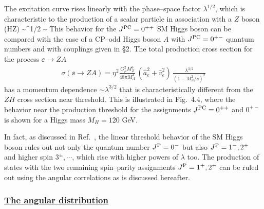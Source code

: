 The excitation curve rises linearly with the phase--space factor 
$\lambda^{1/2}$, which is characteristic to the production of a scalar 
particle in association with a $Z$ boson  
\beq
\sigma (\ee \to HZ) \sim \lambda^{1/2} \sim {} 
\eeq
This behavior for the $J^{\rm PC}=0^{++}$ SM Higgs boson can be compared with
the case of a CP--odd Higgs boson $A$ with $J^{\rm PC}=0^{+-}$ quantum 
numbers and with couplings given in \S2. The total production cross section
for the process $\ee \to ZA$ \cite{Bargeretal,ee-HZ-stong}
\begin{eqnarray}
\sigma (\ee \to ZA) = \eta^2\frac{G_\mu^2M_Z^6}{48\pi M_A^4} \, 
(\hat{a}_e^2+\hat{v}_e^2) \, \frac{\lambda^{3/2}}{(1-M_Z^2/s)^2}
\end{eqnarray}
has a momentum dependence $\sim \lambda^{3/2}$ that is characteristically
different  from the $ZH$ cross section near threshold. This is illustrated in
Fig.~4.4, where the behavior near the production threshold for the assignments
$J^{\rm PC}= 0^{++}$ and $0^{+-}$ is shown for a Higgs mass $M_H=120$ GeV.\s

\begin{figure}[!h]
\begin{center}
\vspace*{-1.cm}
\hspace*{-1.cm}
\end{center}
\vspace*{-14.9cm}
\vspace*{-.2cm}
\end{figure}

In fact, as discussed in Ref.~\cite{ee-Hspin}, the linear threshold behavior of
the SM Higgs boson rules out not only the quantum number $J^{\rm P}=0^{-}$ but
also $J^{\rm P}=1^{-}, 2^{+}$ and higher spin $3^\pm,  \cdots$, which rise
with higher powers of  $\lambda$ too.  The production of states with the two
remaining spin--parity assignments $J^{\rm P}=1^+, 2^+$ can be ruled out using 
the angular correlations as is discussed hereafter.  

\subsubsection*{\underline{ The angular distribution}}

